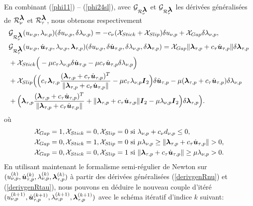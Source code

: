 \noindent En combinant (\ref{phi11}) -- (\ref{phi24sl}), avec ${\cal G}_{{\cal R}_{\nu}^{\mbox{\boldmath{$\lambda$}}}}$ et ${\cal G}_{{\cal R}_{\tau}^{\mbox{\boldmath{$\lambda$}}}}$ les dérivées généralisées de ${\cal R}_{\nu}^{\mbox{\boldmath{$\lambda$}}}$ et ${\cal R}_{\tau}^{\mbox{\boldmath{$\lambda$}}}$, nous obtenons respectivement
\begin{align}
&{\cal G}_{{\cal R}_{\nu}^{\mbox{\boldmath{$\lambda$}}}}(u_{\nu, p},\lambda_{\nu, p})(\delta u_{\nu, p},\delta\lambda_{\nu, p})= -c_{\nu}({\cal X}_{Stick}+ {\cal X}_{Slip})\delta u_{\nu, p} + {\cal X}_{Gap} \delta\lambda_{\nu, p},\label{derivgenRnu}\\
&{\cal G}_{{\cal R}_{\tau}^{\mbox{\boldmath{$\lambda$}}}}(u_{\nu, p},\dot{\mbox{\boldmath{$u$}}}_{\tau, p},\lambda_{\nu, p},\mbox{\boldmath{$\lambda$}}_{\tau, p})(\delta u_{\nu, p},\delta\dot{\mbox{\boldmath{$u$}}}_{\tau, p},\delta\lambda_{\nu, p},\delta\mbox{\boldmath{$\lambda$}}_{\tau, p})= {\cal X}_{Gap}\|\mbox{\boldmath{$\lambda$}}_{\tau, p}+c_\tau \dot{\mbox{\boldmath{$u$}}}_{\tau, p}\| \delta\mbox{\boldmath{$\lambda$}}_{\tau, p}\\
&+ {\cal X}_{Stick} \Big( -\mu c_\tau \lambda_{\nu, p}\delta\dot{\mbox{\boldmath{$u$}}}_{\tau, p} -\mu c_\tau \dot{\mbox{\boldmath{$u$}}}_{\tau, p}\delta{\lambda_{\nu, p}} \Big)\nonumber\\
&+ {\cal X}_{Slip} \Big( \Big(c_\tau \mbox{\boldmath{$\lambda$}}_{\tau, p}\frac{(\mbox{\boldmath{$\lambda$}}_{\tau, p}+c_\tau \dot{\mbox{\boldmath{$u$}}}_{\tau, p})^T}{\|\mbox{\boldmath{$\lambda$}}_{\tau, p}+c_\tau \dot{\mbox{\boldmath{$u$}}}_{\tau, p}\|}-\mu c_\tau \lambda_{\nu, p}\mbox{\boldmath{$I$}}_2\Big)\delta{\dot{\mbox{\boldmath{$u$}}}_{\tau, p}}  - \mu (\mbox{\boldmath{$\lambda$}}_{\tau, p}+c_\tau \dot{\mbox{\boldmath{$u$}}}_{\tau, p})\delta\lambda_{\nu, p}\nonumber\\
& +\Big( \mbox{\boldmath{$\lambda$}}_{\tau, p}\frac{(\mbox{\boldmath{$\lambda$}}_{\tau, p}+c_\tau \dot{\mbox{\boldmath{$u$}}}_{\tau, p})^T}{\|\mbox{\boldmath{$\lambda$}}_{\tau, p}+c_\tau \dot{\mbox{\boldmath{$u$}}}_{\tau, p}\|} +\|\mbox{\boldmath{$\lambda$}}_{\tau, p}+c_\tau \dot{\mbox{\boldmath{$u$}}}_{\tau, p}\|\mbox{\boldmath{$I$}}_2 - \mu\lambda_{\nu, p}\mbox{\boldmath{$I$}}_2  \Big)\delta{\mbox{\boldmath{$\lambda$}}_{\tau, p}} \Big )\nonumber.\label{derivgenRtau}
\end{align}
où 
\begin{align*}
&{\cal X}_{Gap} =1, {\cal X}_{Stick} = 0, {\cal X}_{Slip} = 0\ {\rm si}\ \lambda_{\nu, p}+c_{\nu}d_{\nu,p}\le 0,\\
&{\cal X}_{Gap} =0, {\cal X}_{Stick} = 1, {\cal X}_{Slip} = 0\ {\rm si}\ \mu \lambda_{\nu, p}\ge \|\blambda_{\tau, p}+c_\tau \dot\bu_{\tau, p}\|> 0,\\
&{\cal X}_{Gap} =0, {\cal X}_{Stick} = 0,  {\cal X}_{Slip} = 1\ {\rm si}\ \|\blambda_{\tau, p}+c_\tau \dot\bu_{\tau, p}\|\ge \mu \lambda_{\nu, p}> 0.
\end{align*}
En utilisant maintenant le formalisme semi-régulier de Newton sur $(u_{\nu, p}^{(k)},\dot{\mbox{\boldmath{$u$}}}_{\tau, p}^{(k)},\lambda_{\nu, p}^{(k)},\mbox{\boldmath{$\lambda$}}_{\tau, p}^{(k)})$ à partir des dérivées généralisées (\ref{derivgenRnu}) et (\ref{derivgenRtau}), nous pouvons en déduire le nouveau couple d'itéré $(u_{\nu, p}^{(k+1)},\dot{\mbox{\boldmath{$u$}}}_{\tau, p}^{(k+1)},\lambda_{\nu, p}^{(k+1)},\mbox{\boldmath{$\lambda$}}_{\tau, p}^{(k+1)})$ avec le schéma itératif d'indice $k$ suivant:

